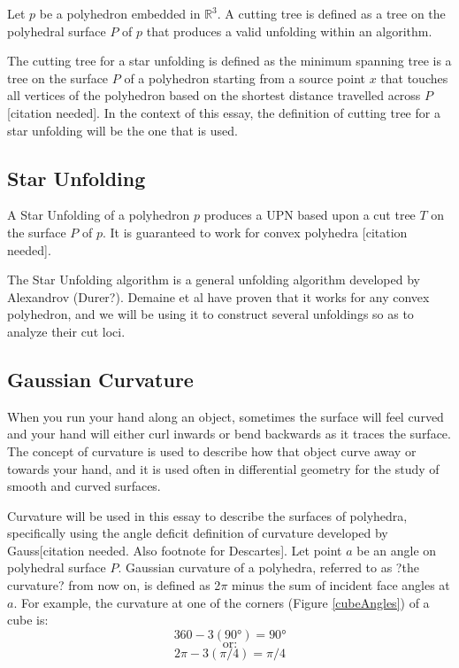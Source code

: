 \documentclass[12 pt]{article}
\begin{document}
Let $p$ be a polyhedron embedded in $\mathbb{R}^3$. A cutting tree is defined as a tree on the polyhedral surface $P$ of $p$ that produces a valid unfolding within an algorithm. 

The cutting tree for a star unfolding is defined as the minimum spanning tree is a tree on the surface $P$ of a polyhedron starting from a source point $x$ that touches all vertices of the polyhedron based on the shortest distance travelled across $P$ [citation needed]. In the context of this essay, the definition of cutting tree for a star unfolding will be the one that is used.
\subsection*{Star Unfolding}

A Star Unfolding of a polyhedron $p$ produces a UPN based upon a cut tree $T$ on the surface $P$ of $p$. It is guaranteed to work for convex polyhedra [citation needed]. 

The Star Unfolding algorithm is a general unfolding algorithm developed by Alexandrov (Durer?). Demaine et al have proven that it works for any convex polyhedron, and we will be using it to construct several unfoldings so as to analyze their cut loci.

\subsection*{Gaussian Curvature}
When you run your hand along an object, sometimes the surface will feel curved and your hand will either curl inwards or bend backwards as it traces the surface. The concept of curvature is used to describe how that object curve away or towards your hand, and it is used often in differential geometry for the study of smooth and curved surfaces.

Curvature will be used in this essay to describe the surfaces of polyhedra, specifically using the angle deficit definition of curvature developed by Gauss[citation needed. Also footnote for Descartes]. Let point $a$ be an angle on polyhedral surface $P$. Gaussian curvature of a polyhedra, referred to as ?the curvature? from now on, is defined as 2$\pi$ minus the sum of incident face angles at $a$.
For example, the curvature at one of the corners (Figure \ref{cubeAngles}) of a cube is: 
$$360-3(\ang{90}) = \ang{90}$$
$$\mbox{or:}$$
$$2\pi - 3(\pi/4) = \pi/4$$
\end{document}
